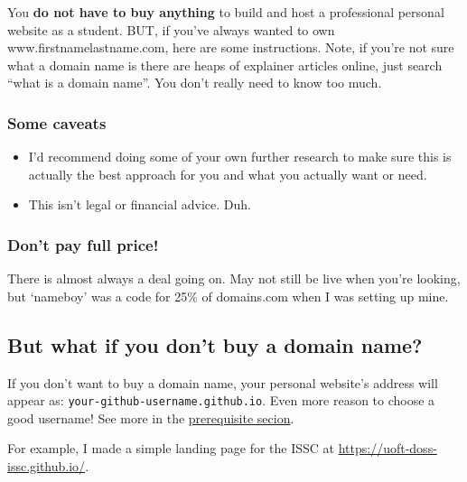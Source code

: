 \documentclass[
]{article}
\providecommand{\tightlist}{%
  \setlength{\itemsep}{0pt}\setlength{\parskip}{0pt}}
\begin{document}
You \textbf{do not have to buy anything} to build and host a professional personal website as a student. BUT, if you've always wanted to own www.firstnamelastname.com, here are some instructions. Note, if you're not sure what a domain name is there are heaps of explainer articles online, just search ``what is a domain name''. You don't really need to know too much.

\hypertarget{some-caveats}{%
\subsubsection{Some caveats}\label{some-caveats}}

\begin{itemize}
\tightlist
\item
  I'd recommend doing some of your own further research to make sure this is actually the best approach for you and what you actually want or need.
\item
  This isn't legal or financial advice. Duh.
\end{itemize}

\hypertarget{dont-pay-full-price}{%
\subsubsection{Don't pay full price!}\label{dont-pay-full-price}}

There is almost always a deal going on. May not still be live when you're looking, but `nameboy' was a code for 25\% of domains.com when I was setting up mine.

\hypertarget{but-what-if-you-dont-buy-a-domain-name}{%
\subsection{But what if you don't buy a domain name?}\label{but-what-if-you-dont-buy-a-domain-name}}

If you don't want to buy a domain name, your personal website's address will appear as: \texttt{your-github-username.github.io}. Even more reason to choose a good username! See more in the \protect\hyperlink{prereqs}{prerequisite secion}.

For example, I made a simple landing page for the ISSC at \url{https://uoft-doss-issc.github.io/}.
\end{document}
